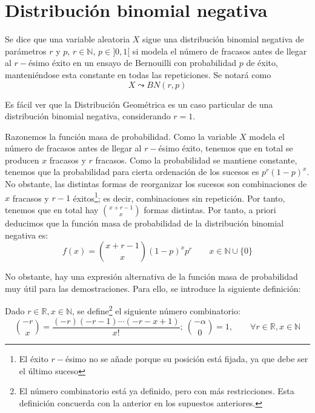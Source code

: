 \section{Distribución binomial negativa}
\begin{definicion}
    Se dice que una variable aleatoria $X$ sigue una distribución binomial negativa de parámetros $r$ y $p$, $r\in \mathbb{N}$, $p\in ]0,1[$ si modela el número de fracasos antes de llegar al $r-$ésimo éxito en un ensayo de Bernouilli con probabilidad $p$ de éxito, manteniéndose esta constante en todas las repeticiones. Se notará como $$X\leadsto BN(r,p)$$
\end{definicion}
\begin{observacion}
    Es fácil ver que la Distribución Geométrica es un caso particular de una distribución binomial negativa, considerando $r=1$.
\end{observacion}

Razonemos la función masa de probabilidad. Como la variable $X$ modela el número de fracasos antes de llegar al $r-$ésimo éxito, tenemos que en total se producen $x$ fracasos y $r$ fracasos. Como la probabilidad se mantiene constante, tenemos que la probabilidad para cierta ordenación de los sucesos es $p^r(1-p)^{x}$. No obstante, las distintas formas de reorganizar los sucesos son combinaciones de $x$ fracasos y $r-1$ éxitos\footnote{El éxito $r-$ésimo no se añade porque su posición está fijada, ya que debe ser el último suceso}; es decir, combinaciones sin repetición. Por tanto, tenemos que en total hay $\binom{x+r-1}{x}$ formas distintas. Por tanto, a priori deducimos que la función masa de probabilidad de la distribución binomial negativa es:
\begin{equation*}
    f(x) = \binom{x+r-1}{x}(1-p)^{x}p^r \qquad x\in \mathbb{N}\cup \{0\}
\end{equation*}

No obstante, hay una expresión alternativa de la función masa de probabilidad muy útil para las demostraciones. Para ello, se introduce la siguiente definición:
\begin{definicion}
    Dado $r\in \mathbb{R}, x\in \mathbb{N}$, se define\footnote{El número combinatorio está ya definido, pero con más restricciones. Esta definición concuerda con la anterior en los supuestos anteriores.} el siguiente número combinatorio:
    \begin{equation*}
        \binom{-r}{x} = \frac{(-r)(-r-1)\cdots (-r-x+1)}{x!};~\binom{-\alpha}{0}=1, \qquad \forall r\in \mathbb{R}, x\in \mathbb{N}
    \end{equation*}
\end{definicion}

